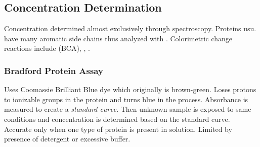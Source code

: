 \documentclass[../Bio_chemistryReview.tex]{subfiles}
\begin{document}
\subsection{Concentration Determination\supdag}

Concentration determined almost exclusively through spectroscopy. Proteins usu.
have many aromatic side chains thus analyzed with .
Colorimetric change reactions include  (BCA),
, .

\subsubsection{Bradford Protein Assay\supdag}

Uses Coomassie Brilliant Blue dye which originally is brown-green. Loses protons
to ionizable groups in the protein and turns blue in the process. Absorbance is
measured to create a \emph{standard curve}. Then unknown sample is exposed to
same conditions and concentration is determined based on the standard curve.
Accurate only when one type of protein is present in solution. Limited by
presence of detergent or excessive buffer.  
\end{document}
